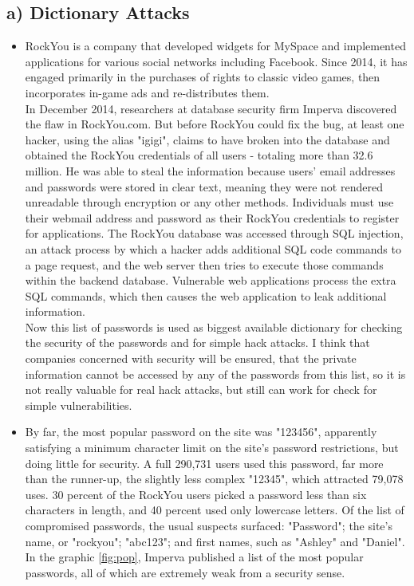 \documentclass{article}
\begin{document}
\subsection*{a) Dictionary Attacks}
\begin{itemize}
\item RockYou is a company that developed widgets for MySpace and implemented applications for various social networks including Facebook. Since 2014, it has engaged primarily in the purchases of rights to classic video games, then incorporates in-game ads and re-distributes them.
\\
In December 2014, researchers at database security firm Imperva discovered the flaw in RockYou.com. But before RockYou could fix the bug, at least one hacker, using the alias "igigi", claims to have broken into the database and obtained the RockYou credentials of all users - totaling more than 32.6 million. He was able to steal the information because users' email addresses and passwords were stored in clear text, meaning they were not rendered unreadable through encryption or any other methods. Individuals must use their webmail address and password as their RockYou credentials to register for applications. The RockYou database was accessed through SQL injection, an attack process by which a hacker adds additional SQL code commands to a page request, and the web server then tries to execute those commands within the backend database. Vulnerable web applications process the extra SQL commands, which then causes the web application to leak additional information.
\\
Now this list of passwords is used as biggest available dictionary for checking the security of the passwords and for simple hack attacks. I think that companies concerned with security will be ensured, that the private information cannot be accessed by any of the passwords from this list, so it is not really valuable for real hack attacks, but still can work for check for simple vulnerabilities.
\bigskip

\item By far, the most popular password on the site was "123456", apparently satisfying a minimum character limit on the site's password restrictions, but doing little for security. A full 290,731 users used this password, far more than the runner-up, the slightly less complex "12345", which attracted 79,078 uses.  30 percent of the RockYou users picked a password less than six characters in length, and 40 percent used only lowercase letters. Of the list of compromised passwords, the usual suspects surfaced: "Password"; the site's name, or "rockyou"; "abc123"; and first names, such as "Ashley" and "Daniel". In the graphic \ref{fig:pop}, Imperva published a list of the most popular passwords, all of which are extremely weak from a security sense.


\end{itemize}
\end{document}
